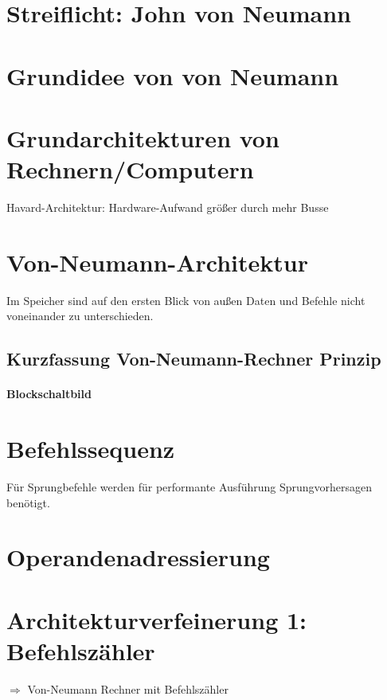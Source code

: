 \section*{Streiflicht: John von Neumann}

\section{Grundidee von von Neumann}
\section{Grundarchitekturen von Rechnern/Computern}
Havard-Architektur: Hardware-Aufwand größer durch mehr Busse

\section{Von-Neumann-Architektur}
Im Speicher sind auf den ersten Blick von außen Daten und Befehle nicht voneinander zu unterschieden.

\subsection{Kurzfassung Von-Neumann-Rechner Prinzip}
\paragraph{Blockschaltbild}

\section{Befehlssequenz}
Für Sprungbefehle werden für performante Ausführung Sprungvorhersagen benötigt.

\section{Operandenadressierung}

\section{Architekturverfeinerung 1: Befehlszähler}
$\Rightarrow$ Von-Neumann Rechner mit Befehlszähler

